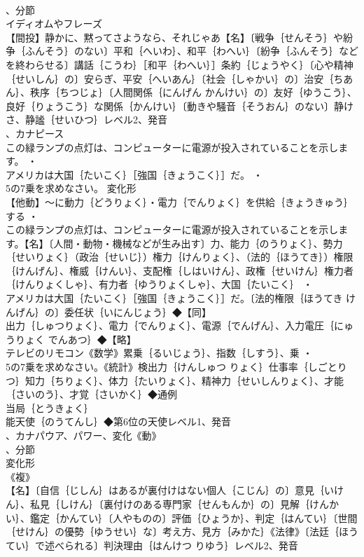 \documentclass[8pt]{extreport}
\begin{document}
\begin{CJK}{UTF8}{min}
\\	、分節
\\	イディオムやフレーズ 
\\	【間投】静かに、黙ってさようなら、それじゃあ【名】〔戦争｛せんそう｝や紛争｛ふんそう｝のない〕平和｛へいわ｝、和平｛わへい｝〔紛争｛ふんそう｝などを終わらせる〕講話｛こうわ｝［和平｛わへい｝］条約｛じょうやく｝〔心や精神｛せいしん｝の〕安らぎ、平安｛へいあん｝〔社会｛しゃかい｝の〕治安｛ちあん｝、秩序｛ちつじょ｝〔人間関係｛にんげん かんけい｝の〕友好｛ゆうこう｝、良好｛りょうこう｝な関係｛かんけい｝〔動きや騒音｛そうおん｝のない〕静けさ、静謐｛せいひつ｝レベル2、発音
\\	、カナピース
\\	この緑ランプの点灯は、コンピューターに電源が投入されていることを示します。 ・
\\	アメリカは大国｛たいこく｝［強国｛きょうこく｝］だ。 ・
\\	5の7乗を求めなさい。	変化形 
\\	【他動】～に動力｛どうりょく｝・電力｛でんりょく｝を供給｛きょうきゅう｝する ・
\\	この緑ランプの点灯は、コンピューターに電源が投入されていることを示します。【名】〔人間・動物・機械などが生み出す〕力、能力｛のうりょく｝、勢力｛せいりょく｝（政治｛せいじ｝）権力｛けんりょく｝、（法的｛ほうてき｝）権限｛けんげん｝、権威｛けんい｝、支配権｛しはいけん｝、政権｛せいけん｝権力者｛けんりょくしゃ｝、有力者｛ゆうりょくしゃ｝、大国｛たいこく｝ ・
\\	アメリカは大国｛たいこく｝［強国｛きょうこく｝］だ。〔法的権限｛ほうてき けんげん｝の〕委任状｛いにんじょう｝◆【同】
\\	出力｛しゅつりょく｝、電力｛でんりょく｝、電源｛でんげん｝、入力電圧｛にゅうりょく でんあつ｝◆【略】
\\	テレビのリモコン《数学》累乗｛るいじょう｝、指数｛しすう｝、乗 ・
\\	5の7乗を求めなさい。《統計》検出力｛けんしゅつ りょく｝仕事率｛しごとりつ｝知力｛ちりょく｝、体力｛たいりょく｝、精神力｛せいしんりょく｝、才能｛さいのう｝、才覚｛さいかく｝◆通例
\\	当局｛とうきょく｝
\\	能天使｛のうてんし｝◆第6位の天使レベル1、発音
\\	、カナパウア、パワー、変化《動》
\\	、分節
\\	変化形 
\\	《複》
\\	【名】〔自信｛じしん｝はあるが裏付けはない個人｛こじん｝の〕意見｛いけん｝、私見｛しけん｝〔裏付けのある専門家｛せんもんか｝の〕見解｛けんかい｝、鑑定｛かんてい｝〔人やものの〕評価｛ひょうか｝、判定｛はんてい｝〔世間｛せけん｝の優勢｛ゆうせい｝な〕考え方、見方｛みかた｝《法律》〔法廷｛ほうてい｝で述べられる〕判決理由｛はんけつ りゆう｝レベル2、発音

\end{CJK}
\end{document}
